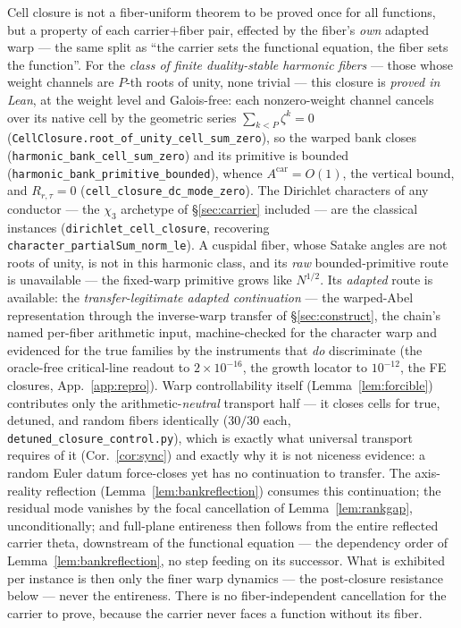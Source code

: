 \documentclass[11pt]{article}
\theoremstyle{definition}
\begin{document}
\noindent Cell closure is not a fiber-uniform theorem to be proved once for all functions, but a property
of each carrier$+$fiber pair, effected by the fiber's \emph{own} adapted warp --- the same split as ``the
carrier sets the functional equation, the fiber sets the function''. For the \emph{class of finite
duality-stable harmonic fibers} --- those whose weight channels are $P$-th roots of unity, none trivial ---
this closure is \emph{proved in Lean}, at the weight level and Galois-free: each nonzero-weight channel
cancels over its native cell by the geometric series $\sum_{k<P}\zeta^k=0$
(\texttt{CellClosure.root\_of\_unity\_cell\_sum\_zero}), so the warped bank closes
(\texttt{harmonic\_bank\_cell\_sum\_zero}) and its primitive is bounded
(\texttt{harmonic\_bank\_primitive\_bounded}), whence $A^{\mathrm{car}}=O(1)$, the vertical bound, and
$R_{r,\tau}=0$ (\texttt{cell\_closure\_dc\_mode\_zero}). The Dirichlet characters of any conductor ---
the $\chi_3$ archetype of \S\ref{sec:carrier} included --- are the classical instances
(\texttt{dirichlet\_cell\_closure}, recovering \texttt{character\_partialSum\_norm\_le}). A cuspidal fiber,
whose Satake angles are not roots of unity, is not in this harmonic class, and its \emph{raw} bounded-primitive
route is unavailable --- the fixed-warp primitive grows like $N^{1/2}$. Its \emph{adapted} route is available:
the \emph{transfer-legitimate adapted continuation} --- the warped-Abel representation through the inverse-warp
transfer of \S\ref{sec:construct}, the chain's named per-fiber arithmetic input, machine-checked for the
character warp and evidenced for the true families by the instruments that \emph{do} discriminate (the
oracle-free critical-line readout to $2\times10^{-16}$, the growth locator to $10^{-12}$, the FE closures,
App.~\ref{app:repro}). Warp controllability itself (Lemma~\ref{lem:forcible}) contributes only the
arithmetic-\emph{neutral} transport half --- it closes cells for true, detuned, and random fibers identically
($30/30$ each, \texttt{detuned\_closure\_control.py}), which is exactly what universal transport requires of it
(Cor.~\ref{cor:sync}) and exactly why it is not niceness evidence: a random Euler datum force-closes yet has no
continuation to transfer. The axis-reality
reflection (Lemma~\ref{lem:bankreflection}) consumes this continuation; the residual mode vanishes by the focal
cancellation of Lemma~\ref{lem:rankgap}, unconditionally; and full-plane entireness then follows from the entire
reflected carrier theta, downstream of the functional equation --- the dependency order of
Lemma~\ref{lem:bankreflection}, no step feeding on its successor.
What is exhibited per instance is then only the finer warp dynamics --- the post-closure resistance below ---
never the entireness. There is no fiber-independent cancellation for the carrier to prove, because the
carrier never faces a function without its fiber.
\end{document}
